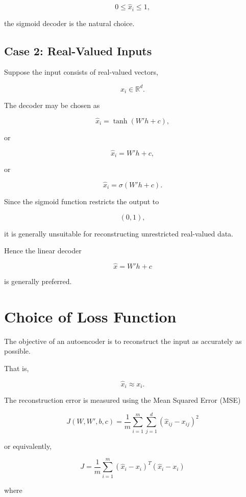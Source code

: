 \documentclass{article}
\begin{document}
	\[
	0\le \hat{x}_i\le 1,
	\]
	
	the sigmoid decoder is the natural choice.
	
	
	\subsection*{Case 2: Real-Valued Inputs}
	
	Suppose the input consists of real-valued vectors,
	
	\[
	x_i\in\mathbb{R}^d.
	\]
	
	The decoder may be chosen as
	
	\[
	\hat{x}_i=\tanh(W'h+c),
	\]
	
	or
	
	\[
	\hat{x}_i=W'h+c,
	\]
	
	or
	
	\[
	\hat{x}_i=\sigma(W'h+c).
	\]
	
	Since the sigmoid function restricts the output to
	
	\[
	(0,1),
	\]
	
	it is generally unsuitable for reconstructing unrestricted real-valued data.
	
	Hence the linear decoder
	
	\[
	\boxed{\hat{x}=W'h+c}
	\]
	
	is generally preferred.
	
	
	\section{Choice of Loss Function}
	
	The objective of an autoencoder is to reconstruct the input as accurately as possible.
	
	That is,
	
	\[
	\hat{x}_i\approx x_i.
	\]
	
	The reconstruction error is measured using the Mean Squared Error (MSE)
	
	\[
	\boxed{
		J(W,W',b,c)
		=
		\frac1m
		\sum_{i=1}^{m}
		\sum_{j=1}^{d}
		(\hat{x}_{ij}-x_{ij})^2
	}
	\]
	
	or equivalently,
	
	\[
	\boxed{
		J
		=
		\frac1m
		\sum_{i=1}^{m}
		(\hat{x}_i-x_i)^T
		(\hat{x}_i-x_i)
	}
	\]
	
	where
	
\end{document}

